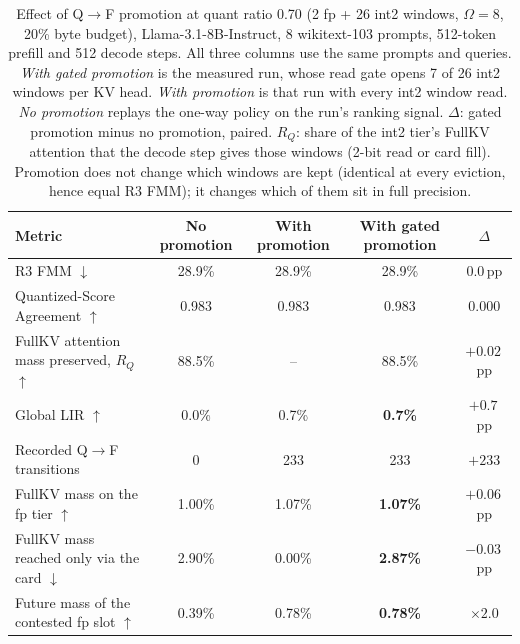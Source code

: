\begin{table}[t]
\centering
\small
\setlength{\tabcolsep}{3.5pt}
\begin{tabular}{@{}lcccc@{}}
\toprule
Metric & No promotion & With promotion & With gated promotion & $\Delta$ \\
\midrule
R3 FMM $\downarrow$                                  & 28.9\% & 28.9\% & 28.9\%          & $0.0$\,pp   \\
Quantized-Score Agreement $\uparrow$                 & 0.983  & 0.983  & 0.983           & $0.000$     \\
FullKV attention mass preserved, $R_Q$ $\uparrow$    & 88.5\% & --     & 88.5\%          & $+0.02$\,pp \\
Global LIR $\uparrow$                                & 0.0\%  & 0.7\%  & \textbf{0.7\%}  & $+0.7$\,pp  \\
Recorded Q$\to$F transitions                         & 0      & 233    & 233             & $+233$      \\
\midrule
FullKV mass on the fp tier $\uparrow$                & 1.00\% & 1.07\% & \textbf{1.07\%} & $+0.06$\,pp \\
FullKV mass reached only via the card $\downarrow$   & 2.90\% & 0.00\% & \textbf{2.87\%} & $-0.03$\,pp \\
Future mass of the contested fp slot $\uparrow$      & 0.39\% & 0.78\% & \textbf{0.78\%} & $\times 2.0$ \\
\bottomrule
\end{tabular}
\caption{Effect of Q$\to$F promotion at quant ratio 0.70 (2 fp + 26 int2 windows,
$\Omega = 8$, 20\% byte budget), Llama-3.1-8B-Instruct, 8 wikitext-103 prompts,
512-token prefill and 512 decode steps. All three columns use the same prompts and
queries. \emph{With gated promotion} is the measured run, whose read gate opens 7 of
26 int2 windows per KV head. \emph{With promotion} is that run with every int2
window read. \emph{No promotion} replays the one-way policy on the run's ranking
signal. $\Delta$: gated promotion minus no promotion, paired. $R_Q$: share of the
int2 tier's FullKV attention that the decode step gives those windows (2-bit read
or card fill). Promotion does not change which windows are kept (identical at every
eviction, hence equal R3 FMM); it changes which of them sit in full precision.}
\label{tab:promotion-q070}
\end{table}

